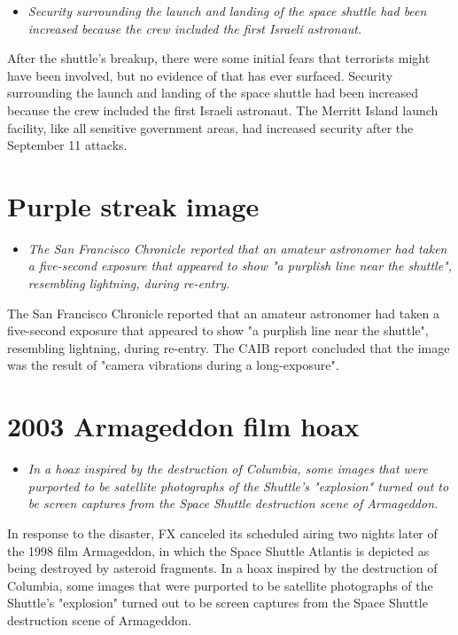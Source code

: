 \begin{itemize}
\item
  \emph{Security surrounding the launch and landing of the space shuttle
  had been increased because the crew included the first Israeli
  astronaut.}
\end{itemize}

After the shuttle's breakup, there were some initial fears that
terrorists might have been involved, but no evidence of that has ever
surfaced. Security surrounding the launch and landing of the space
shuttle had been increased because the crew included the first Israeli
astronaut. The Merritt Island launch facility, like all sensitive
government areas, had increased security after the September 11 attacks.

\section{Purple streak image}\label{purple-streak-image}

\begin{itemize}
\item
  \emph{The San Francisco Chronicle reported that an amateur astronomer
  had taken a five-second exposure that appeared to show "a purplish
  line near the shuttle", resembling lightning, during re-entry.}
\end{itemize}

The San Francisco Chronicle reported that an amateur astronomer had
taken a five-second exposure that appeared to show "a purplish line near
the shuttle", resembling lightning, during re-entry. The CAIB report
concluded that the image was the result of "camera vibrations during a
long-exposure".

\section{2003 Armageddon film hoax}\label{armageddon-film-hoax}

\begin{itemize}
\item
  \emph{In a hoax inspired by the destruction of Columbia, some images
  that were purported to be satellite photographs of the Shuttle's
  "explosion" turned out to be screen captures from the Space Shuttle
  destruction scene of Armageddon.}
\end{itemize}

In response to the disaster, FX canceled its scheduled airing two nights
later of the 1998 film Armageddon, in which the Space Shuttle Atlantis
is depicted as being destroyed by asteroid fragments. In a hoax inspired
by the destruction of Columbia, some images that were purported to be
satellite photographs of the Shuttle's "explosion" turned out to be
screen captures from the Space Shuttle destruction scene of Armageddon.

